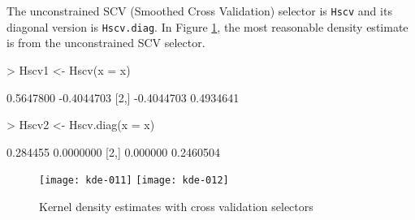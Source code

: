 \documentclass[a4paper,11pt]{article}
\let\code=\texttt
\let\pkg=\texttt
\begin{document}
The unconstrained SCV (Smoothed Cross Validation) selector is \code{Hscv} and 
its diagonal version is \code{Hscv.diag}.
In Figure \ref{fig:cv}, the most
reasonable density estimate is from the unconstrained SCV selector. 
 
\begin{Schunk}
\begin{Sinput}
> Hscv1 <- Hscv(x = x)
\end{Sinput}
\begin{Soutput}
           [,1]       [,2]
[1,]  0.5647800 -0.4044703
[2,] -0.4044703  0.4934641
\end{Soutput}
\begin{Sinput}
> Hscv2 <- Hscv.diag(x = x)
\end{Sinput}
\begin{Soutput}
         [,1]      [,2]
[1,] 0.284455 0.0000000
[2,] 0.000000 0.2460504
\end{Soutput}
\end{Schunk}

\begin{figure}[!ht]
\centering
\texttt{[image: kde-011]}
\texttt{[image: kde-012]}
\caption{Kernel density estimates with cross validation selectors}
\label{fig:cv}
\end{figure}




\end{document}
